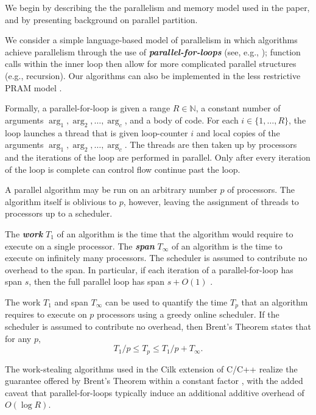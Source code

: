 \documentclass[11pt]{article}
\newcommand{\defn}[1]{{\textit{\textbf{\boldmath #1}}} }
\renewcommand{\paragraph}[1]{\vspace{0.09in}\noindent{\bf \boldmath #1.}}
\theoremstyle{remark}
\theoremstyle{remark}
\begin{document}
We begin by describing the the parallelism and memory model used in the paper,
and by presenting background on parallel partition.

\paragraph{Workflow Model} We consider a simple language-based model of
parallelism in which algorithms achieve parallelism through the use of
\defn{parallel-for-loops} (see, e.g., \cite{Blelloch96,AcarBl16,CLRS});
function calls within the inner loop then allow for more complicated parallel
structures (e.g., recursion). Our algorithms can also be implemented in the
less restrictive PRAM model \cite{Blelloch96, AcarBl16}.

Formally, a parallel-for-loop is given a range $R \in \mathbb{N}$, a constant
number of arguments $\arg_1, \arg_2, \ldots, \arg_c$, and a body of code. For
each $i \in \{1, \ldots, R\}$, the loop launches a thread that is given
loop-counter $i$ and local copies of the arguments $\arg_1, \arg_2, \ldots,
\arg_c$. The threads are then taken up by processors and the iterations of the
loop are performed in parallel. Only after every iteration of the loop is
complete can control flow continue past the loop.

A parallel algorithm may be run on an arbitrary number $p$ of
processors. The algorithm itself is oblivious to $p$, however, leaving
the assignment of threads to processors up to a scheduler.

The \defn{work} $T_1$ of an algorithm is the time that the algorithm
would require to execute on a single processor. The \defn{span}
$T_\infty$ of an algorithm is the time to execute on infinitely many
processors. The scheduler is assumed to contribute no overhead to the
span. In particular, if each iteration of a
parallel-for-loop has span $s$, then the full parallel loop has span
$s + O(1)$ \cite{Blelloch96,AcarBl16}.

The work $T_1$ and span $T_\infty$ can be used to quantify the time $T_p$
that an algorithm requires to execute on $p$ processors using a greedy
online scheduler. If the scheduler is assumed to contribute no
overhead, then Brent's Theorem \cite{Brent74} states that for any
$p$,
$$T_1 / p \le T_p \le T_1 / p + T_\infty.$$

The work-stealing algorithms used in the Cilk extension of C/C++ realize
the guarantee offered by Brent's Theorem within a constant factor
\cite{BlumofeJo96,BlumofeLe99}, with the added caveat that parallel-for-loops
typically induce an additional additive overhead of $O(\log R)$. 
\end{document}
